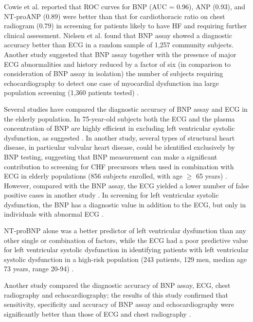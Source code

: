 \documentclass[14pt,a4paper,onecolumn]{extarticle}
\begin{document}
Cowie et al. \citep{bib3110} reported that ROC curves for BNP (AUC = 0.96), ANP (0.93), and NT-proANP (0.89) were better than that for cardiothoracic ratio on chest radiogram (0.79) in screening for patients likely to have HF and requiring further clinical assessment. Nielsen et al. \citep{bib392} found that BNP assay showed a diagnostic accuracy better than ECG in a random sample of 1,257 community subjects.  Another study suggested that BNP assay together with the presence of major ECG abnormalities and history reduced by a factor of six (in comparison to consideration of BNP assay in isolation) the number of subjects requiring echocardiography to detect one case of myocardial dysfunction ina large population screening (1,360 patients tested) \citep{bib3171}.

Several studies have compared the diagnostic accuracy of BNP assay and ECG in the elderly population. In 75-year-old subjects both the ECG and the plasma concentration of BNP are highly efficient in excluding left ventricular systolic dysfunction, as  suggested \citep{bib3173}. In another study, several types of structural heart disease, in particular valvular heart disease, could be identified exclusively by BNP testing, suggesting that BNP measurement can make a significant contribution to screening for CHF precursors when used in combination with ECG in elderly populations (856 subjects enrolled, with age $\geq$ 65 years) \citep{bib3174}. However, compared with the BNP assay, the ECG yielded a lower number of false positive cases in another study \citep{bib3172}. In screening for left ventricular systolic dysfunction, the BNP has a diagnostic value in addition to the ECG, but only in individuals with abnormal ECG \citep{bib3172}.

NT-proBNP alone was a better predictor of left ventricular dysfunction than any other single or combination of factors, while the ECG had a poor predictive value for left ventricular systolic dysfunction in identifying patients with left ventricular systolic  dysfunction in a high-risk population (243 patients, 129 men, median age 73 years, range 20-94) \citep{bib3173}.

Another study \citep{bib3170} compared the diagnostic accuracy of BNP assay, ECG, chest radiography and echocardiography; the results of this study confirmed that sensitivity, specificity and accuracy of BNP assay and echocardiography were significantly better than those of ECG and chest radiography \citep{bib3170}.
\end{document}
